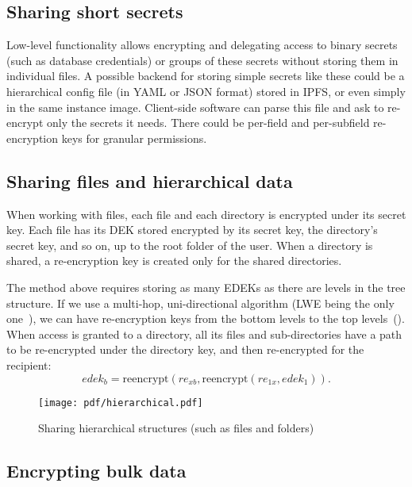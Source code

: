 \documentclass[longbibliography,nofootinbib]{revtex4-1}
\begin{document}
\begin{CJK*}{UTF8}{gbsn}
\subsection{Sharing short secrets}

Low-level functionality allows encrypting and delegating access to binary secrets (such as database credentials) or groups of these secrets without
storing them in individual files.
A possible backend for storing simple secrets like these could be a hierarchical config file (in YAML or JSON format) stored in IPFS,
or even simply in the same instance image.
Client-side software can parse this file and ask to re-encrypt only the secrets it needs.
There could be per-field and per-subfield re-encryption keys for granular permissions.

\subsection{Sharing files and hierarchical data}
\label{sec:hierarchical-data}

When working with files, each file and each directory is encrypted under its secret key.
Each file has its DEK stored encrypted by its secret key, the directory's secret key, and so on, up to the root folder of the user.
When a directory is shared, a re-encryption key is created only for the shared directories.

The method above requires storing as many EDEKs as there are levels in the tree structure.
If we use a multi-hop, uni-directional algorithm (LWE being the only one~\cite{lwe-reencryption}), we can have re-encryption keys from the bottom levels to
the top levels~().
When access is granted to a directory, all its files and sub-directories have a path to be re-encrypted under the directory key, and then re-encrypted for the
recipient:
\begin{equation}
    edek_b = \text{reencrypt}(re_{xb}, \text{reencrypt}(re_{1x}, edek_1)).
\end{equation}
\begin{figure}
\centering
    \texttt{[image: pdf/hierarchical.pdf]}
    \caption{Sharing hierarchical structures (such as files and folders)}
    \label{fig:hierarchical-pre}
\end{figure}

\subsection{Encrypting bulk data}


\end{CJK*}
\end{document}
